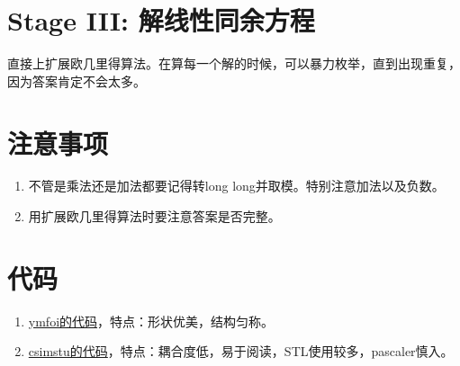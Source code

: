 \documentclass{article}
\begin{document}
\section{Stage III: 解线性同余方程}
直接上扩展欧几里得算法。在算每一个解的时候，可以暴力枚举，直到出现重复，因为答案肯定不会太多。
\section{注意事项}
\begin{enumerate}
\item 不管是乘法还是加法都要记得转long long并取模。特别注意加法以及负数。
\item 用扩展欧几里得算法时要注意答案是否完整。
\end{enumerate}

\section{代码}
\begin{enumerate}
\item \href{http://www.tedyin.com/blog/archive/567/}{ymfoi的代码}，特点：形状优美，结构匀称。
\item \href{https://ideone.com/5Uuhi}{csimstu的代码}，特点：耦合度低，易于阅读，STL使用较多，pascaler慎入。
\end{enumerate}
\end{document}
